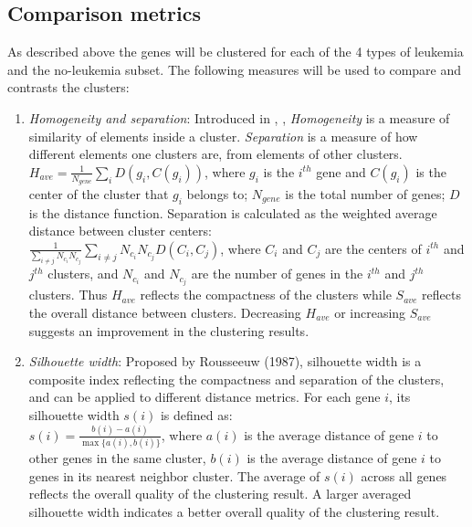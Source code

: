 \documentclass[11pt]{extarticle} %
\begin{document}
\subsection*{Comparison metrics}
As described above the genes will be clustered for each of the 4 types of leukemia and the no-leukemia subset. The following measures will be used to compare and contrasts the clusters:
\begin{enumerate}
\item {\emph{Homogeneity and separation}}: Introduced in \cite{Shamir_etal_2004_DAM}, \cite{Shamir_Sharan_2001_CTCB}, {\emph{Homogeneity}} is a measure of similarity of elements inside a cluster. {\emph{Separation}} is a measure of how different elements one clusters are, from elements of other clusters. \\ 
$H_{ave} = \frac{1}{N_{gene}}\sum _iD(g_i, C(g_i))$, where $g_i$ is the $i^{th}$ gene and $C(g_i)$ is the center of the cluster that $g_i$ belongs to; $N_{gene}$ is the total number of genes; $D$ is the distance function. Separation is calculated as the weighted average distance between cluster centers: \\
$\frac{1}{\sum _{i \ne j} N_{c_i}N_{c_j}} \sum _{i \ne j}N_{c_i}N_{c_j} D(C_i, C_j)$, where $C_i$ and $C_j$ are the centers of $i^{th}$ and $j^{th}$ clusters, and $N_{c_i}$ and $N_{c_j}$ are the number of genes in the $i^{th}$ and $j^{th}$ clusters. Thus $H_{ave}$ reflects the compactness of the clusters while $S_{ave}$ reflects the overall distance between clusters. Decreasing $H_{ave}$ or increasing $S_{ave}$ suggests an improvement in the clustering results.

\item {\emph{Silhouette width}}: Proposed by Rousseeuw (1987), silhouette width is a composite index reflecting the compactness and separation of the clusters, and can be applied to different distance metrics. For each gene $i$, its silhouette width $s(i)$ is defined as: \\
$s(i) = \frac{b(i) - a(i)}{\max\{a(i), b(i) \}}$, where $a(i)$ is the average distance of gene $i$ to other genes in the same cluster, $b(i)$ is the average distance of gene $i$ to genes in its nearest neighbor cluster. The average of $s(i)$ across all genes reflects the overall quality of the clustering result. A larger averaged silhouette width indicates a better  overall quality of the clustering result.


\end{enumerate}
\end{document}
